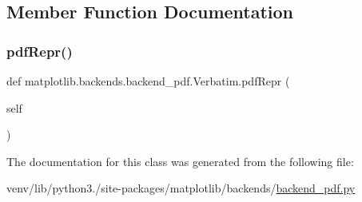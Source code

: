 \subsection{Member Function Documentation}
\mbox{\label{classmatplotlib_1_1backends_1_1backend__pdf_1_1Verbatim_a62235e6e70153217b339406ee45967a7}} 
\subsubsection{\texorpdfstring{pdf\+Repr()}{pdfRepr()}}
{\footnotesize\ttfamily def matplotlib.\+backends.\+backend\+\_\+pdf.\+Verbatim.\+pdf\+Repr (\begin{DoxyParamCaption}\item[{}]{self }\end{DoxyParamCaption})}



The documentation for this class was generated from the following file\+:\begin{DoxyCompactItemize}
\item 
venv/lib/python3./site-\/packages/matplotlib/backends/\hyperlink{backend__pdf_8py}{backend\+\_\+pdf.\+py}\end{DoxyCompactItemize}
